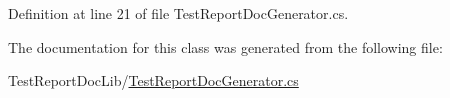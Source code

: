 Definition at line 21 of file Test\+Report\+Doc\+Generator.\+cs.



The documentation for this class was generated from the following file\+:\begin{DoxyCompactItemize}
\item 
Test\+Report\+Doc\+Lib/\hyperlink{_test_report_doc_generator_8cs}{Test\+Report\+Doc\+Generator.\+cs}\end{DoxyCompactItemize}
